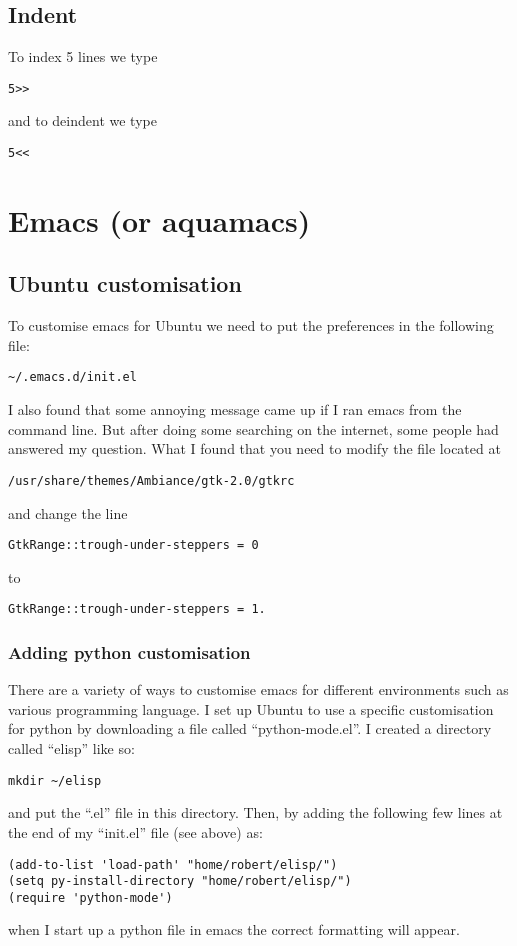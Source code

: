 \documentclass[a4paper, 10pt]{article}
\begin{document}
\subsection*{Indent}
To index 5 lines we type
\begin{verbatim}
5>>
 \end{verbatim}
and to deindent we type
\begin{verbatim}
5<<
 \end{verbatim}

\section*{Emacs (or aquamacs)}

\subsection*{Ubuntu customisation}
\label{sec:ubuntu-customisation}

To customise emacs for Ubuntu we need to put the preferences in the
following file:
\begin{verbatim}
~/.emacs.d/init.el
\end{verbatim}

I also found that some annoying message came up if I ran emacs from
the command line. But after doing some searching on the internet, some
people had answered my question. What I found that you need to modify
the file located at
\begin{verbatim}
/usr/share/themes/Ambiance/gtk-2.0/gtkrc
\end{verbatim}
and change the line 
\begin{verbatim}
GtkRange::trough-under-steppers = 0
\end{verbatim}
to 
\begin{verbatim}
GtkRange::trough-under-steppers = 1.
\end{verbatim}

\subsubsection{Adding python customisation}
\label{sec:adding-pyth-cust}

There are a variety of ways to customise emacs for different
environments such as various programming language. I set up Ubuntu to
use a specific customisation for python by downloading a file called
``python-mode.el''. I created a directory called ``elisp'' like so:
\begin{verbatim}
mkdir ~/elisp
\end{verbatim}
and put the ``.el'' file in this directory. Then, by adding the
following few lines at the end of my ``init.el'' file (see above) as:
\begin{verbatim}
(add-to-list 'load-path' "home/robert/elisp/")
(setq py-install-directory "home/robert/elisp/")
(require 'python-mode')
\end{verbatim}
when I start up a python file in emacs the correct formatting will appear.
\end{document}

